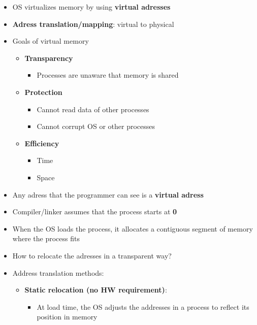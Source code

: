 \documentclass[a4paper,11pt,english]{article}
\begin{document}
\begin{itemize}
\begin{itemize}
        \end{itemize}
    \item OS virtualizes memory by using \textbf{\color{blue} virtual adresses}
    \item \textbf{\color{blue} Adress translation/mapping}: virtual to physical
    \item Goals of virtual memory
        \begin{itemize}
            \item \textbf{\color{blue} Transparency}
                \begin{itemize}
                    \item Processes are unaware that memory is shared 
                \end{itemize}
            \item \textbf{\color{blue} Protection}
                \begin{itemize}
                    \item Cannot read data of other processes
                    \item Cannot corrupt OS or other processes
                \end{itemize}
            \item \textbf{\color{blue} Efficiency}
                \begin{itemize}
                    \item Time
                    \item Space
                \end{itemize}
        \end{itemize}
    \item Any adress that the programmer can see is a \textbf{\color{blue} virtual adress}
    \item Compiler/linker assumes that the process starts at \textbf{\color{blue} 0}
    \item When the OS loads the process, it allocates a contiguous segment of memory where the process fits
    \item How to relocate the adresses in a transparent way?
    \item Address translation methods:
        \begin{itemize}
            \item \textbf{\color{blue} Static relocation (no HW requirement)}:
                \begin{itemize}
                    \item At load time, the OS adjusts the addresses in a process to reflect its position in memory

\end{itemize}
\end{itemize}
\end{itemize}
\end{document}
